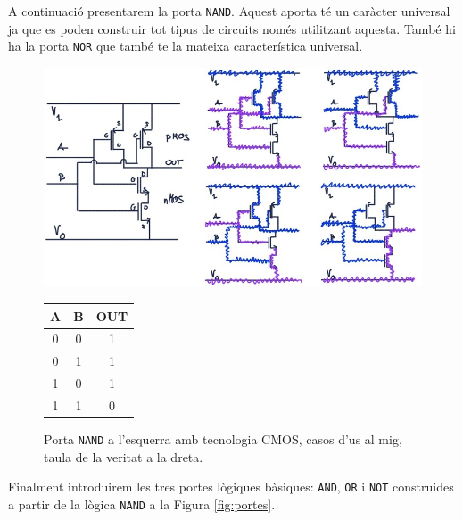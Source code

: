 \documentclass[11pt,a4paper]{article}
\begin{document}
A continuació presentarem la porta \texttt{NAND}. Aquest aporta té un caràcter universal ja que es poden construir tot tipus de circuits només utilitzant aquesta. També hi ha la porta \texttt{NOR} que també te la mateixa característica universal.

\begin{figure}[h!]
    \centering
    \begin{minipage}[t]{0.7\textwidth}
        \centering
        \includegraphics[width=\linewidth]{images/nand.jpg}
        \label{fig:nand}
    \end{minipage}
    \hfill
    \begin{minipage}[t]{0.25\textwidth}
    \centering
    \vspace{-4.7cm}
    \begin{tabular}{cc|c}
      \textbf{A} & \textbf{B} & \textbf{OUT} \\
      \hline
      0 & 0 & 1 \\
      0 & 1 & 1 \\
      1 & 0 & 1 \\
      1 & 1 & 0 \\
    \end{tabular}
    \label{tab:nand}
  \end{minipage}
    \caption{Porta \texttt{NAND} a l'esquerra amb tecnologia CMOS, casos d'us al mig, taula de la veritat a la dreta.}
  
\end{figure}

Finalment introduirem les tres portes lògiques bàsiques: \texttt{AND}, \texttt{OR} i \texttt{NOT} construides a partir de la lògica \texttt{NAND} a la Figura \ref{fig:portes}.
\end{document}
